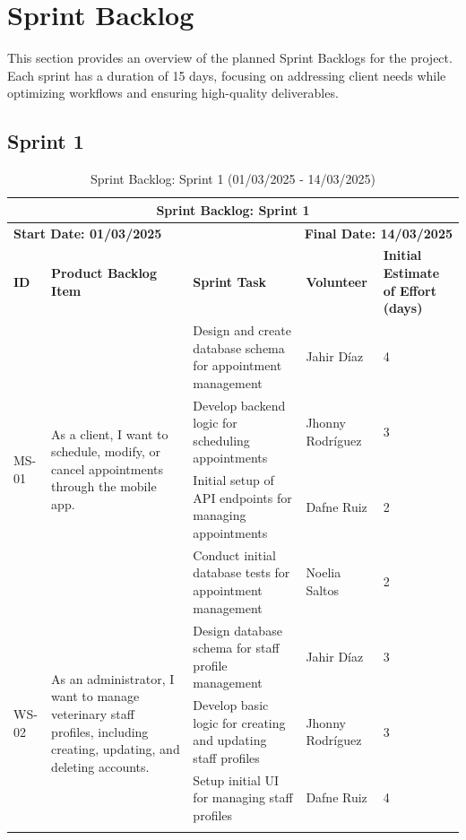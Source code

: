 \documentclass[a4paper,12pt]{report}
\begin{document}
	
	\clearpage
	
	\section{Sprint Backlog}
	This section provides an overview of the planned Sprint Backlogs for the project. Each sprint has a duration of 15 days, focusing on addressing client needs while optimizing workflows and ensuring high-quality deliverables.
	
	\subsection{Sprint 1}
	
	\begin{longtable}{|p{2cm}|p{4cm}|p{5cm}|p{3cm}|p{2cm}|} 
		\hline
		\multicolumn{5}{|c|}{\textbf{Sprint Backlog: Sprint 1}} \\
		\hline
		\multicolumn{2}{|l|}{\textbf{Start Date: 01/03/2025}} & \multicolumn{3}{r|}{\textbf{Final Date: 14/03/2025}} \\
		\hline
		\textbf{ID} & \textbf{Product Backlog Item} & \textbf{Sprint Task} & \textbf{Volunteer} & \textbf{Initial Estimate of Effort (days)} \\
		\hline
		\multirow{4}{*}{MS-01} 
		& \multirow{4}{4cm}{As a client, I want to schedule, modify, or cancel appointments through the mobile app.}
		& Design and create database schema for appointment management & Jahir Díaz & 4 \\
		\cline{3-5}
		& & Develop backend logic for scheduling appointments & Jhonny Rodríguez & 3 \\
		\cline{3-5}
		& & Initial setup of API endpoints for managing appointments & Dafne Ruiz & 2 \\
		\cline{3-5}
		& & Conduct initial database tests for appointment management & Noelia Saltos & 2 \\
		\hline
		\multirow{3}{*}{WS-02}
		& \multirow{3}{4cm}{As an administrator, I want to manage veterinary staff profiles, including creating, updating, and deleting accounts.}
		& Design database schema for staff profile management & Jahir Díaz & 3 \\
		\cline{3-5}
		& & Develop basic logic for creating and updating staff profiles & Jhonny Rodríguez & 3 \\
		\cline{3-5}
		& & Setup initial UI for managing staff profiles & Dafne Ruiz & 4 \\
		\hline
		\caption{Sprint Backlog: Sprint 1 (01/03/2025 - 14/03/2025)}
	\end{longtable}
	
\end{document}
